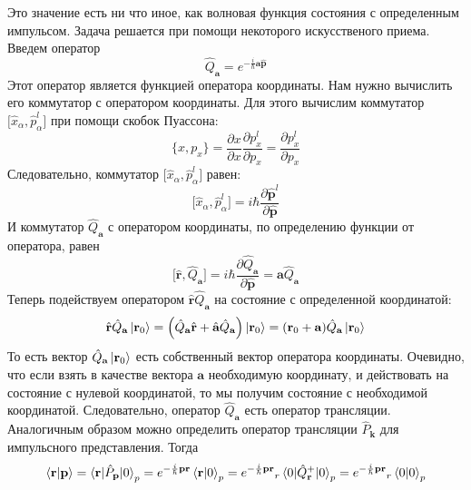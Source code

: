 \documentclass{article}
\begin{document}
\begin{enumerate}
	Это значение есть ни что иное, как волновая функция состояния с определенным импульсом. Задача решается при помощи некоторого искусственого приема. Введем оператор
	\begin{equation}
		\hat{Q}_{\textbf{a}} = e^{-\frac{i}{\hbar}\textbf{a}\hat{\textbf{p}}}
	\end{equation}
	Этот оператор является функцией оператора координаты. Нам нужно вычислить его коммутатор с оператором координаты. Для этого вычислим коммутатор $\big[\hat{x}_\alpha,\hat{p}_\alpha^l \big]$ при помощи скобок Пуассона:
	\begin{equation}
		\Big\{x, p_x \Big\} = \frac{\partial x}{\partial x} \frac{\partial p_x^l}{\partial p_x} = \frac{\partial p_x^l}{\partial p_x}
	\end{equation}
	Следовательно, коммутатор $\big[\hat{x}_\alpha,\hat{p}_\alpha^l \big]$ равен:
	\begin{equation}
		\big[\hat{x}_\alpha,\hat{p}_\alpha^l \big] = i\hbar \frac{\partial \hat{\textbf{p}}^l}{\partial \hat{\textbf{p}}}
	\end{equation}
	И коммутатор $\hat{Q}_\textbf{a}$ с оператором координаты, по определению функции от оператора, равен
	\begin{equation}
		\Big[\hat{\textbf{r}},\hat{Q}_\textbf{a} \Big] = i\hbar \frac{\partial \hat{Q}_\textbf{a}}{\partial \hat{\textbf{p}}} = \textbf{a}\hat{Q}_\textbf{a}
	\end{equation}
	Теперь подействуем оператором $\hat{\textbf{r}}\hat{Q}_\textbf{a}$ на состояние с определенной координатой:
	\begin{equation}
		\hat{\textbf{r}}\hat{Q}_\textbf{a} \ket{\textbf{r}_0} = \Big(\hat{Q}_\textbf{a}\hat{\textbf{r}} + \hat{\textbf{a}}\hat{Q}_\textbf{a}\Big)\ket{\textbf{r}_0} = (\textbf{r}_0 + \textbf{a})\hat{Q}_\textbf{a} \ket{\textbf{r}_0}
	\end{equation}
	То есть вектор $\hat{Q}_\textbf{a} \ket{\textbf{r}_0}$ есть собственный вектор оператора координаты. Очевидно, что если взять в качестве вектора $\textbf{a}$ необходимую координату, и действовать на состояние с нулевой координатой, то мы получим состояние с необходимой координатой. Следовательно, оператор $\hat{Q}_\textbf{a}$ есть оператор трансляции. Аналогичным образом можно определить оператор трансляции $\hat{P}_\textbf{k}$ для импульсного представления. Тогда
	\begin{equation}
		\braket{\textbf{r}|\textbf{p}} = \braket{\textbf{r}|\hat{P}_\textbf{p}|0}_p = e^{-\frac{i}{\hbar}\textbf{pr}} \braket{\textbf{r}|0}_p = {e^{-\frac{i}{\hbar}\textbf{pr}}}_r \braket{0|\hat{Q}_\textbf{r}^+|0}_p = {e^{-\frac{i}{\hbar}\textbf{pr}}}_r \braket{0|0}_p \label{rp}

\end{equation}
\end{enumerate}
\end{document}
